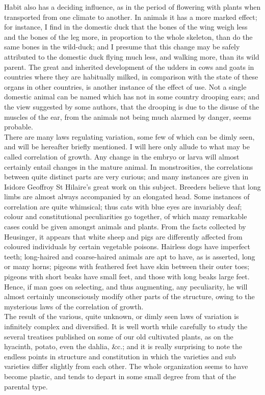 \indent Habit also has a deciding influence, as in the period of flowering with plants when transported from one climate to another. In animals it has a more marked effect; for instance, I find in the domestic duck that the bones of the wing weigh less and the bones of the leg more, in proportion to the whole skeleton, than do the same bones in the wild-duck; and I presume that this change may be safely attributed to the domestic duck flying much less, and walking more, than its wild parent. The great and inherited development of the udders in cows and goats in countries where they are habitually milked, in comparison with the state of these organs in other countries, is another instance of the effect of use. Not a single domestic animal can be named which has not in some country drooping ears; and the view suggested by some authors, that the drooping is due to the disuse of the muscles of the ear, from the animals not being much alarmed by danger, seems probable.  \\
\indent There are many laws regulating variation, some few of which can be dimly seen, and will be hereafter briefly mentioned. I will here only allude to what may be called correlation of growth. Any change in the embryo or larva will almost certainly entail changes in the mature animal.  In monstrosities, the correlations between quite distinct parts are very curious; and many instances are given in Isidore Geoffroy St Hilaire's great work on this subject.  Breeders believe that long limbs are almost always accompanied by an elongated head. Some instances of correlation are quite whimsical; thus cats with blue eyes are invariably deaf; colour and constitutional peculiarities go together, of which many remarkable cases could be given amongst animals and plants. From the facts collected by Heusinger, it appears that white sheep and pigs are differently affected from coloured individuals by certain vegetable poisons. Hairless dogs have imperfect teeth; long-haired and coarse-haired animals are apt to have, as is asserted, long or many horns; pigeons with feathered feet have skin between their outer toes; pigeons with short beaks have small feet, and those with long beaks large feet. Hence, if man goes on selecting, and thus augmenting, any peculiarity, he will almost certainly unconsciously modify other parts of the structure, owing to the mysterious laws of the correlation of growth.  \\
\indent The result of the various, quite unknown, or dimly seen laws of variation is infinitely complex and diversified. It is well worth while carefully to study the several treatises published on some of our old cultivated plants, as on the hyacinth, potato, even the dahlia, \&c.; and it is really surprising to note the endless points in structure and constitution in which the varieties and sub varieties differ slightly from each other. The whole organization seems to have become plastic, and tends to depart in some small degree from that of the parental type.   \\
